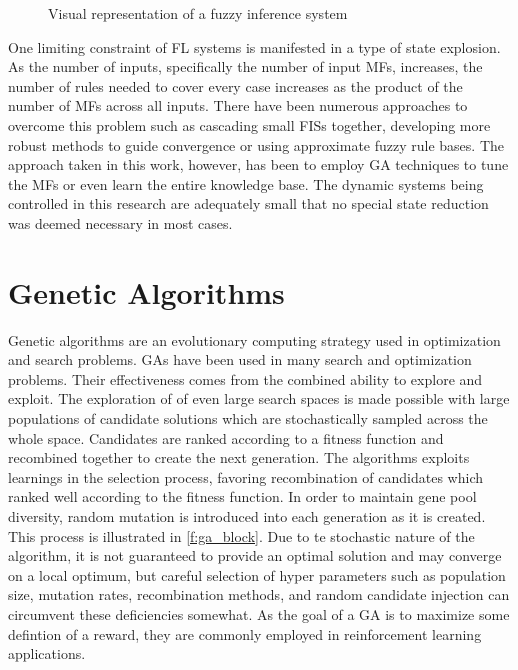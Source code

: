 \begin{figure}[ht]
    \centering
    
    \caption{Visual representation of a fuzzy inference system}\label{f:fis_block}
\end{figure}

One limiting constraint of FL systems is manifested in a type of state explosion. As the number of inputs,
specifically the number of input MFs, increases, the number of rules needed to cover every case increases as
the product of the number of MFs across all inputs. There have been numerous approaches to overcome this
problem such as cascading small FISs together\cite{ernest2015genetic}, developing more robust methods to guide
convergence\cite{hansen1997convergence} or using approximate fuzzy rule bases\cite{cordon:01bk}. The approach
taken in this work, however, has been to employ GA techniques to tune the MFs or even learn the entire
knowledge base. The dynamic systems being controlled in this research are adequately small that no special
state reduction was deemed necessary in most cases.

\section{Genetic Algorithms}
Genetic algorithms are an evolutionary computing strategy used in optimization and search problems. GAs have
been used in many search and optimization problems\cite{bodenhofer1997ten}. Their effectiveness comes
from the combined ability to explore and exploit. The exploration of of even large search spaces is made
possible with large populations of candidate solutions which are stochastically sampled across the whole
space. Candidates are ranked according to a fitness function and recombined together to create the next
generation. The algorithms exploits learnings in the selection process, favoring recombination of candidates
which ranked well according to the fitness function. In order to maintain gene pool diversity, random mutation
is introduced into each generation as it is created. This process is illustrated in \cref{f:ga_block}. Due to
te stochastic nature of the algorithm, it is not guaranteed to provide an optimal solution and may converge on
a local optimum, but careful selection of hyper parameters such as population size, mutation rates,
recombination methods, and random candidate injection can circumvent these deficiencies somewhat. As the goal
of a GA is to maximize some defintion of a reward, they are commonly employed in reinforcement learning
applications\cite{salimans2017evolution}.

